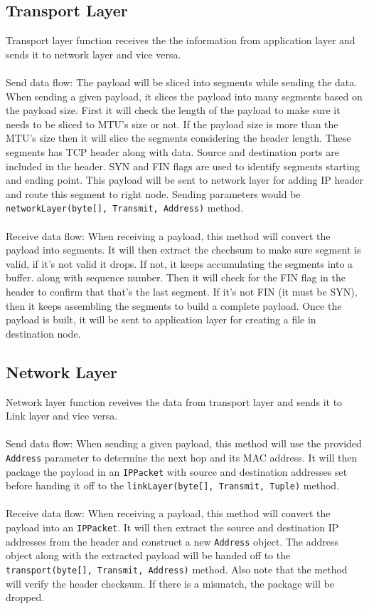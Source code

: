 \documentclass{scrartcl}
\begin{document}
\subsection{Transport Layer}
Transport layer function receives the the information from application layer and sends it to network layer and vice versa. \\ \\
Send data flow: 
The payload will be sliced into segments while sending the data. When sending a given payload, it slices the payload into many segments based on the payload size. First it will check the length of the payload to make sure it needs to be sliced to MTU's size or not. If the payload size is more than the MTU's size then it will slice the segments considering the header length. These segments has TCP header along with data. Source and destination ports are included in the header. SYN and FIN flags are used to identify segments starting and ending point. This payload will be sent to network layer for adding IP header and route this segment to right node. Sending parameters would be \texttt{networkLayer(byte[], Transmit, Address)} method. \\ \\
Receive data flow:
When receiving a payload, this method will convert the payload into segments. It will then extract the chechsum to make sure segment is valid, if it's not valid it drops. If not, it keeps accumulating the segments into a buffer. along with sequence number. Then it will check for the FIN flag in the header to confirm that that's the last segment. If it's not FIN (it must be SYN), then it keeps assembling the segments to build a complete payload. Once the payload is built, it will be sent to application layer for creating a file in destination node.
\subsection{Network Layer}
Network layer function reveives the data from transport layer and sends it to Link layer and vice versa. \\ \\
Send data flow:
When sending a given payload, this method will use the provided  \texttt{Address} parameter to determine the next hop and its MAC address. It will then package the payload in an  \texttt{IPPacket} with source and destination addresses set before handing it off to the  \texttt{linkLayer(byte[], Transmit, Tuple)} method. \\ \\
Receive data flow:
When receiving a payload, this method will convert the payload into an  \texttt{IPPacket}. It will then extract the source and destination IP addresses from the header and construct a new \texttt{Address} object. The address object along with the extracted payload will be handed off to the  \texttt{transport(byte[], Transmit, Address)} method. Also note that the method will verify the header checksum. If there is a mismatch, the package will be dropped.
\end{document}
